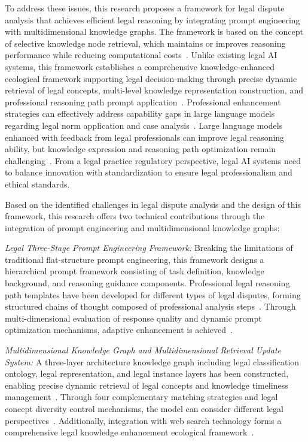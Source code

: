 \documentclass{article}
\theoremstyle{plain}
\theoremstyle{definition}
\begin{document}
To address these issues, this research proposes a framework for legal dispute analysis that achieves efficient legal reasoning by integrating prompt engineering with multidimensional knowledge graphs. The framework is based on the concept of selective knowledge node retrieval, which maintains or improves reasoning performance while reducing computational costs~\cite{Lai2023b}. Unlike existing legal AI systems, this framework establishes a comprehensive knowledge-enhanced ecological framework supporting legal decision-making through precise dynamic retrieval of legal concepts, multi-level knowledge representation construction, and professional reasoning path prompt application~\cite{Zhu2024}. Professional enhancement strategies can effectively address capability gaps in large language models regarding legal norm application and case analysis~\cite{Zubaer2023}. Large language models enhanced with feedback from legal professionals can improve legal reasoning ability, but knowledge expression and reasoning path optimization remain challenging~\cite{Sun2023}. From a legal practice regulatory perspective, legal AI systems need to balance innovation with standardization to ensure legal professionalism and ethical standards.

Based on the identified challenges in legal dispute analysis and the design of this framework, this research offers two technical contributions through the integration of prompt engineering and multidimensional knowledge graphs:

\textit{Legal Three-Stage Prompt Engineering Framework:} Breaking the limitations of traditional flat-structure prompt engineering, this framework designs a hierarchical prompt framework consisting of task definition, knowledge background, and reasoning guidance components. Professional legal reasoning path templates have been developed for different types of legal disputes, forming structured chains of thought composed of professional analysis steps~\cite{Wei2022}. Through multi-dimensional evaluation of response quality and dynamic prompt optimization mechanisms, adaptive enhancement is achieved~\cite{Mumford2023}.

\textit{Multidimensional Knowledge Graph and Multidimensional Retrieval Update System:} A three-layer architecture knowledge graph including legal classification ontology, legal representation, and legal instance layers has been constructed, enabling precise dynamic retrieval of legal concepts and knowledge timeliness management~\cite{Hogan2021}. Through four complementary matching strategies and legal concept diversity control mechanisms, the model can consider different legal perspectives~\cite{Li2021}. Additionally, integration with web search technology forms a comprehensive legal knowledge enhancement ecological framework~\cite{Wan2024}.
\end{document}
